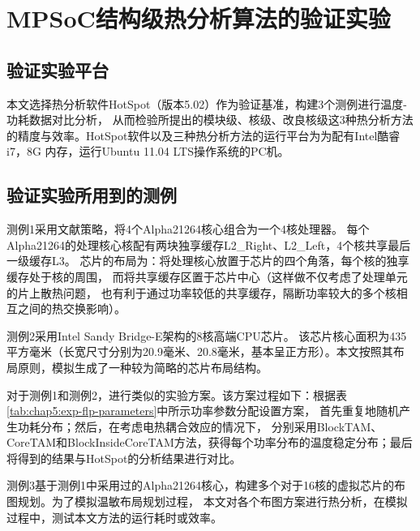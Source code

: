 

\chapter{MPSoC结构级热分析算法的验证实验}
\label{cha:SSTAexperiments}

\section{验证实验平台}
本文选择热分析软件HotSpot（版本5.02）作为验证基准，构建3个测例进行温度-功耗数据对比分析， 从而检验所提出的模块级、核级、改良核级这3种热分析方法的精度与效率。HotSpot软件以及三种热分析方法的运行平台为为配有Intel酷睿i7，8G 内存，运行Ubuntu 11.04 LTS操作系统的PC机。

\section{验证实验所用到的测例}
测例1采用文献策略，将4个Alpha21264核心组合为一个4核处理器。 每个Alpha21264的处理核心核配有两块独享缓存L2\_Right、L2\_Left，4个核共享最后一级缓存L3。 芯片的布局为：将处理核心放置于芯片的四个角落，每个核的独享缓存处于核的周围， 而将共享缓存区置于芯片中心（这样做不仅考虑了处理单元的片上散热问题， 也有利于通过功率较低的共享缓存，隔断功率较大的多个核相互之间的热交换影响）。

测例2采用Intel Sandy Bridge-E架构的8核高端CPU芯片。 该芯片核心面积为435平方毫米（长宽尺寸分别为20.9毫米、20.8毫米，基本呈正方形）。本文按照其布局原则，模拟生成了一种较为简略的芯片布局结构。

对于测例1和测例2，进行类似的实验方案。该方案过程如下：根据表\ref{tab:chap5:exp-flp-parameters}中所示功率参数分配设置方案， 首先重复地随机产生功耗分布；然后，在考虑电热耦合效应的情况下， 分别采用BlockTAM、CoreTAM和BlockInsideCoreTAM方法，获得每个功率分布的温度稳定分布；最后将得到的结果与HotSpot的分析结果进行对比。

测例3基于测例1中采用过的Alpha21264核心，构建多个对于16核的虚拟芯片的布图规划。为了模拟温敏布局规划过程， 本文对各个布图方案进行热分析，在模拟过程中，测试本文方法的运行耗时或效率。

